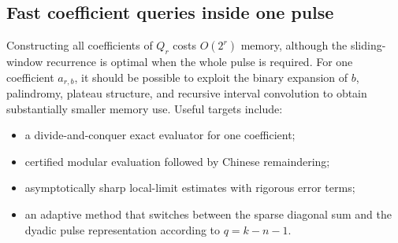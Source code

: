 \documentclass[11pt,oneside]{article}
\numberwithin{equation}{section}
\theoremstyle{definition}
\theoremstyle{remark}
\begin{document}
\subsection{Fast coefficient queries inside one pulse}

Constructing all coefficients of \(Q_r\) costs \(O(2^r)\) memory, although
the sliding-window recurrence is optimal when the whole pulse is required.
For one coefficient \(a_{r,b}\), it should be possible to exploit the
binary expansion of \(b\), palindromy, plateau structure, and recursive
interval convolution to obtain substantially smaller memory use.  Useful
targets include:
\begin{itemize}[leftmargin=2em]
\item a divide-and-conquer exact evaluator for one coefficient;
\item certified modular evaluation followed by Chinese remaindering;
\item asymptotically sharp local-limit estimates with rigorous error terms;
\item an adaptive method that switches between the sparse diagonal sum and
the dyadic pulse representation according to \(q=k-n-1\).
\end{itemize}
\end{document}
